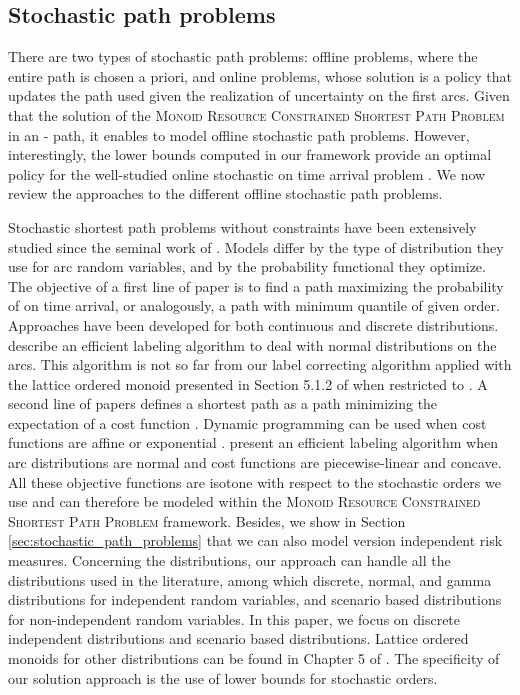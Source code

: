 \documentclass[11pt]{amsart}
\theoremstyle{plain}
\theoremstyle{remark}
\newcommand{\MRCSP}{\textsc{Monoid Resource Constrained Shortest Path Problem}\xspace}
\begin{document}
\subsection{Stochastic path problems} \label{sub:stochastic_paths_problems}

There are two types of stochastic path problems: offline problems, where the entire path is chosen a priori, and online problems, whose solution is a policy that updates the path used given the realization of uncertainty on the first arcs. Given that the solution of the \MRCSP in an - path, it enables to model offline stochastic path problems. However, interestingly, the lower bounds computed in our framework provide an optimal policy \cite{parmentier2016thesis} for the well-studied online stochastic on time arrival problem \citep{fu2001adaptive,fu1998expected,hall1986fastest,fan2006optimal,nie2006arriving,samaranayake2012tractable,sabran2014precomputation,flajolet2014robust}. We now review the approaches to the different offline stochastic path problems.

Stochastic shortest path problems without constraints have been extensively studied since the seminal work of \citet{frank1969shortest}. Models differ by the type of distribution they use for arc random variables, and by the probability functional they optimize. The objective of a first line of paper is to find a path maximizing the probability of on time arrival, or analogously, a path with minimum quantile of given order. Approaches have been developed for both continuous \citep{frank1969shortest,chen2005path,nikolova2006stochastic,nikolova2010high} and discrete \citep{mirchandani1976shortest} distributions. \citet{chen2013finding} describe an efficient labeling algorithm to deal with normal distributions on the arcs. This algorithm is not so far from our label correcting algorithm applied with the lattice ordered monoid presented in Section 5.1.2 of \cite{parmentier2016thesis} when restricted to . A second line of papers defines a shortest path as a path minimizing the expectation of a cost function \citep{loui1983optimal}.
Dynamic programming can be used when cost functions are affine or exponential \citep{eiger1985path}.
\citet{murthy1996relaxation,murthy1998stochastic} present an efficient labeling algorithm when arc distributions are normal and cost functions are piecewise-linear and concave. All these objective functions are isotone with respect to the stochastic orders we use and can therefore be modeled within the \MRCSP framework. Besides, we show in Section \ref{sec:stochastic_path_problems} that we can also model version independent risk measures. Concerning the distributions, our approach can handle all the distributions used in the literature, among which discrete, normal, and gamma distributions for independent random variables, and scenario based distributions for non-independent random variables. In this paper, we focus on discrete independent distributions and scenario based distributions. Lattice ordered monoids for other distributions can be found in Chapter 5 of \cite{parmentier2016thesis}. The specificity of our solution approach is the use of lower bounds for stochastic orders.
\end{document}
